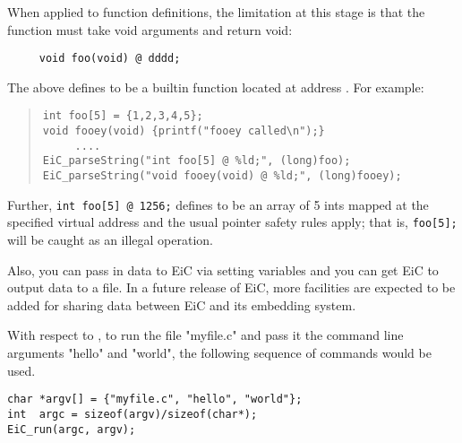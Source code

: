 When applied to function definitions, the limitation at this stage is
that the function must take void arguments and return void:

\begin{production}
\begin{verbatim}
     void foo(void) @ dddd; 
\end{verbatim}
\end{production}

The above defines  to be a builtin function located at address
. For example:

\begin{quote}
\begin{verbatim}
int foo[5] = {1,2,3,4,5};
void fooey(void) {printf("fooey called\n");}
     ....
EiC_parseString("int foo[5] @ %ld;", (long)foo);
EiC_parseString("void fooey(void) @ %ld;", (long)fooey);
\end{verbatim}
\end{quote}

Further, \verb+int foo[5] @ 1256;+ defines  to be an array of 5
ints mapped at the specified virtual address and the usual pointer
safety rules apply; that is, \verb/foo[5];/ will be caught 
as an illegal operation.


Also, you can pass in data to EiC via setting variables and you can
get EiC to output data to a file. In a future release of EiC, more 
facilities are expected to be added for sharing data between EiC and its
embedding system.

With respect to , to run the file "myfile.c"  and pass it the
command line arguments "hello" and "world", the following sequence of
commands would be used.

\begin{production}
\begin{verbatim}
char *argv[] = {"myfile.c", "hello", "world"};
int  argc = sizeof(argv)/sizeof(char*);
EiC_run(argc, argv);
\end{verbatim}
\end{production}

